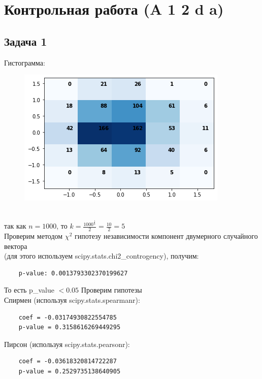 \section*{Контрольная работа (A 1 2 d a)}
\subsection*{Задача 1}
Гистограмма:
\begin{figure}[h]
\includegraphics[scale=0.65]{hist.png}
\end{figure}\\
так как $n = 1000$, то $k = \frac{1000^{\frac{1}{3}}}{2} = \frac{10}{2} = 5$\\
Проверим методом $\chi^2$ гипотезу независимости компонент двумерного случайного вектора\\
(для этого используем scipy.stats.chi2\_controgency), получим:
\begin{verbatim}
    p-value: 0.0013793302370199627
\end{verbatim}
То есть p\_value $< 0.05$
\vskip 0.1in \noindent
Проверим гипотезы\\
Спирмен (используя scipy.stats.spearmanr): 
\begin{verbatim}
    coef = -0.03174930822554785
    p-value = 0.3158616269449295
\end{verbatim}
Пирсон (используя scipy.stats.pearsonr): 
\begin{verbatim}
    coef = -0.03618320814722287
    p-value = 0.2529735138640905
\end{verbatim}
\vskip 0.3in



